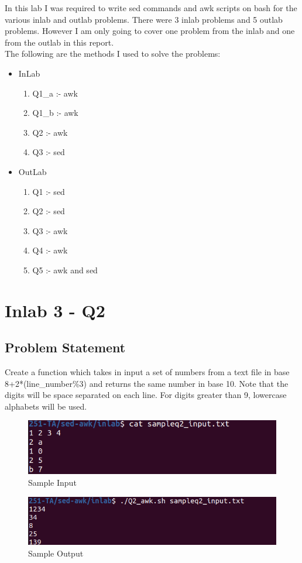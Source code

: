 \documentclass[12pt]{article}
\begin{document}
\vspace*{1em}
In this lab I was required to write sed commands and awk scripts on bash for the 
various inlab and outlab problems. There were 3 inlab problems and 5 outlab problems.
However I am only going to cover one problem from the inlab and one from the outlab 
in this report.\\
The following are the methods I used to solve the problems:\\
\begin{itemize}
    \item InLab
    \begin{enumerate}
        \item Q1\_a :- awk
        \item Q1\_b :- awk
        \item Q2    :- awk
        \item Q3    :- sed
    \end{enumerate}
    \item OutLab
    \begin{enumerate}
        \item Q1 :- sed
        \item Q2 :- sed
        \item Q3 :- awk
        \item Q4 :- awk
        \item Q5 :- awk and sed
    \end{enumerate}
\end{itemize}

\newpage

\section{Inlab 3 - Q2}

\subsection{Problem Statement}
Create a function which takes in input a set of numbers from a text file 
in base 8+2*(line\_number\%3) 
and returns the same number in base 10. 
Note that the digits will be space separated on each line. 
For digits greater than 9, lowercase alphabets will be used.
\begin{figure}[h]
    \includegraphics[width=\textwidth]{inlab3_sample_input.png}
    \caption[]{Sample Input}
\end{figure}
\begin{figure}[h]
    \includegraphics[width=\textwidth]{inlab3_sample_output.png}
    \caption[]{Sample Output}
\end{figure}
\newpage
\end{document}
